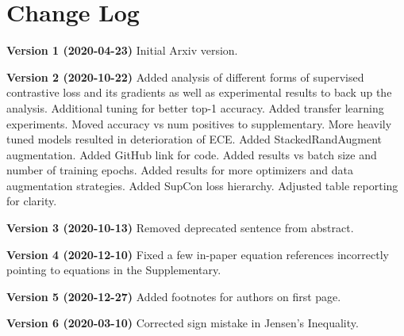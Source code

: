 \section{Change Log}
\noindent\textbf{Version 1 (2020-04-23)}
Initial Arxiv version.

\vspace{3mm}
\noindent\textbf{Version 2 (2020-10-22)}
Added analysis of different forms of supervised contrastive loss and its gradients as well as experimental results to back up the analysis.
Additional tuning for better top-1 accuracy.
Added transfer learning experiments.
Moved accuracy vs num positives to supplementary.
More heavily tuned models resulted in deterioration of ECE.
Added StackedRandAugment augmentation.
Added GitHub link for code.
Added results vs batch size and number of training epochs.
Added results for more optimizers and data augmentation strategies.
Added SupCon loss hierarchy.
Adjusted table reporting for clarity.

\vspace{3mm}
\noindent\textbf{Version 3 (2020-10-13)}
Removed deprecated sentence from abstract.

\vspace{3mm}
\noindent\textbf{Version 4 (2020-12-10)}
Fixed a few in-paper equation references incorrectly pointing to equations in the Supplementary.

\vspace{3mm}
\noindent\textbf{Version 5 (2020-12-27)}
Added footnotes for authors on first page. 

\vspace{3mm}
\noindent\textbf{Version 6 (2020-03-10)}
Corrected sign mistake in Jensen's Inequality.